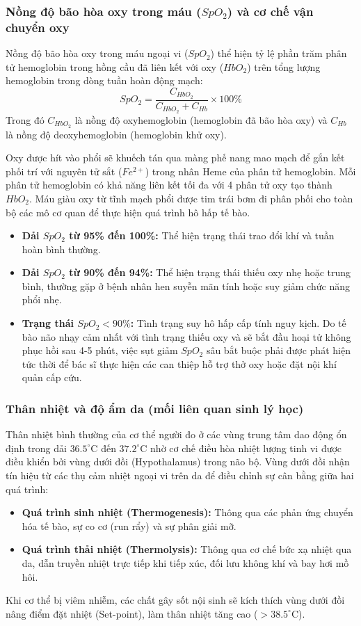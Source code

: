 \subsubsection{Nồng độ bão hòa oxy trong máu ($SpO_2$) và cơ chế vận chuyển oxy}
Nồng độ bão hòa oxy trong máu ngoại vi ($SpO_2$) thể hiện tỷ lệ phần trăm phân tử hemoglobin trong hồng cầu đã liên kết với oxy ($HbO_2$) trên tổng lượng hemoglobin trong dòng tuần hoàn động mạch:
\begin{equation}
    SpO_2 = \frac{C_{HbO_2}}{C_{HbO_2} + C_{Hb}} \times 100\%
\end{equation}
Trong đó $C_{HbO_2}$ là nồng độ oxyhemoglobin (hemoglobin đã bão hòa oxy) và $C_{Hb}$ là nồng độ deoxyhemoglobin (hemoglobin khử oxy). 

Oxy được hít vào phổi sẽ khuếch tán qua màng phế nang mao mạch để gắn kết phối trí với nguyên tử sắt ($Fe^{2+}$) trong nhân Heme của phân tử hemoglobin. Mỗi phân tử hemoglobin có khả năng liên kết tối đa với 4 phân tử oxy tạo thành $HbO_2$. Máu giàu oxy từ tĩnh mạch phổi được tim trái bơm đi phân phối cho toàn bộ các mô cơ quan để thực hiện quá trình hô hấp tế bào.
\begin{itemize}
    \item \textbf{Dải $SpO_2$ từ 95\% đến 100\%:} Thể hiện trạng thái trao đổi khí và tuần hoàn bình thường.
    \item \textbf{Dải $SpO_2$ từ 90\% đến 94\%:} Thể hiện trạng thái thiếu oxy nhẹ hoặc trung bình, thường gặp ở bệnh nhân hen suyễn mãn tính hoặc suy giảm chức năng phổi nhẹ.
    \item \textbf{Trạng thái $SpO_2 < 90\%$:} Tình trạng suy hô hấp cấp tính nguy kịch. Do tế bào não nhạy cảm nhất với tình trạng thiếu oxy và sẽ bắt đầu hoại tử không phục hồi sau 4-5 phút, việc sụt giảm $SpO_2$ sâu bắt buộc phải được phát hiện tức thời để bác sĩ thực hiện các can thiệp hỗ trợ thở oxy hoặc đặt nội khí quản cấp cứu.
\end{itemize}

\subsubsection{Thân nhiệt và độ ẩm da (mối liên quan sinh lý học)}
Thân nhiệt bình thường của cơ thể người đo ở các vùng trung tâm dao động ổn định trong dải $36.5^\circ\text{C}$ đến $37.2^\circ\text{C}$ nhờ cơ chế điều hòa nhiệt lượng tinh vi được điều khiển bởi vùng dưới đồi (Hypothalamus) trong não bộ. Vùng dưới đồi nhận tín hiệu từ các thụ cảm nhiệt ngoại vi trên da để điều chỉnh sự cân bằng giữa hai quá trình:
\begin{itemize}
    \item \textbf{Quá trình sinh nhiệt (Thermogenesis):} Thông qua các phản ứng chuyển hóa tế bào, sự co cơ (run rẩy) và sự phân giải mỡ.
    \item \textbf{Quá trình thải nhiệt (Thermolysis):} Thông qua cơ chế bức xạ nhiệt qua da, dẫn truyền nhiệt trực tiếp khi tiếp xúc, đối lưu không khí và bay hơi mồ hôi.
\end{itemize}
Khi cơ thể bị viêm nhiễm, các chất gây sốt nội sinh sẽ kích thích vùng dưới đồi nâng điểm đặt nhiệt (Set-point), làm thân nhiệt tăng cao ($>38.5^\circ\text{C}$). 

